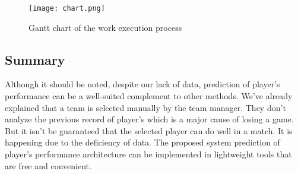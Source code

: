 \begin{figure}[htbp]
\centerline{\texttt{[image: chart.png]}}
\caption{Gantt chart of the work execution process }
\label{fig18}
\end{figure}

\vspace{100mm}


\subsection{Summary}
Although it should be noted, despite our lack of data, prediction of player's performance can be a well-suited complement to other methods. We've already explained that a team is selected manually by the team manager. They don't analyze the previous record of player's which is a major cause of losing a game. But it isn't be guaranteed that the selected player can do well in a match. It is happening due to the deficiency of data. The proposed system prediction of player's performance architecture can be implemented in lightweight tools that are free and convenient.